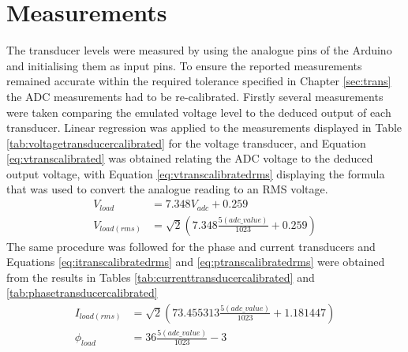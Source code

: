 \section{Measurements} \label{sec:rep_meas}
The transducer levels were measured by using the analogue pins of the Arduino and initialising them as input pins. To ensure the reported measurements remained accurate within the required tolerance specified in Chapter \ref{sec:trans} the ADC measurements had to be re-calibrated. Firstly several measurements were taken comparing the emulated voltage level to the deduced output of each transducer. Linear regression was applied to the measurements displayed in Table \ref{tab:voltagetransducercalibrated} for the voltage transducer, and Equation \ref{eq:vtranscalibrated} was obtained relating the ADC voltage to the deduced output voltage, with Equation \ref{eq:vtranscalibratedrms} displaying the formula that was used to convert the analogue reading to an RMS voltage. 
\begin{align}
  V_{load} &= 7.348V_{adc}+0.259 \label{eq:vtranscalibrated} \\
  V_{load(rms)} &= \sqrt{2}(7.348\frac{5(adc\_value)}{1023}+0.259) \label{eq:vtranscalibratedrms} 
\end{align}
The same procedure was followed for the phase and current transducers and Equations \ref{eq:itranscalibratedrms} and \ref{eq:ptranscalibratedrms} were obtained from the results in Tables \ref{tab:currenttransducercalibrated} and \ref{tab:phasetransducercalibrated}
\begin{align}
  I_{load(rms)} &= \sqrt{2}(73.455313\frac{5(adc\_value)}{1023}+ 1.181447) \label{eq:itranscalibratedrms} \\
  \phi_{load} &= 36\frac{5(adc\_value)}{1023}-3 \label{eq:ptranscalibratedrms} 
\end{align}

